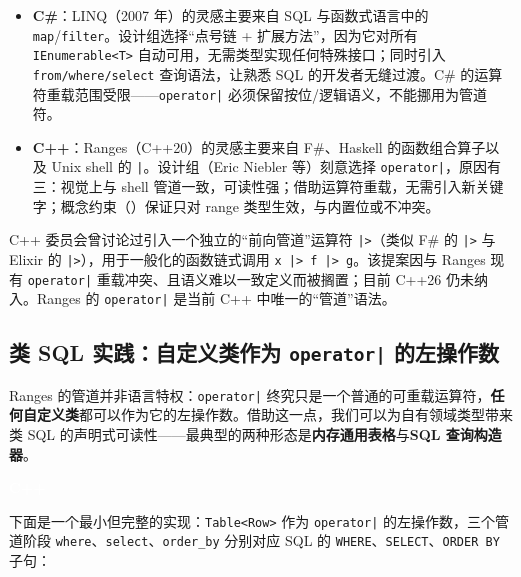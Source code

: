 \documentclass[12pt,a4paper,fontset=fandol]{ctexbook}
\newcommand{\cpp}[1]{C++#1}
\newcommand{\Tp}[1]{\texttt{#1}}
\newcommand{\csharp}{C\#}
\newcommand{\Op}[1]{\texttt{operator#1}}
\newcommand{\cpplabel}{%
  \noindent\begin{tcolorbox}[sharp corners,colback=algheadbg,colframe=algheadbg,
    left=6pt,right=6pt,top=2pt,bottom=2pt,boxrule=0pt]
  \textcolor{white}{\small\bfseries\sffamily C++}\end{tcolorbox}%
}
\begin{document}
\begin{itemize}
  \item \textbf{\csharp{}}：LINQ（2007 年）的灵感主要来自 SQL 与函数式语言中的 \Tp{map}/\allowbreak{}\Tp{filter}。设计组选择``点号链 + 扩展方法''，因为它对所有 \Tp{IEnumerable<T>} 自动可用，无需类型实现任何特殊接口；同时引入 \Tp{from/where/select} 查询语法，让熟悉 SQL 的开发者无缝过渡。\csharp{} 的运算符重载范围受限——\Op{|} 必须保留按位/逻辑语义，不能挪用为管道符。
  \item \textbf{\cpp{}}：Ranges（\cpp{20}）的灵感主要来自 F\#、Haskell 的函数组合算子以及 Unix shell 的 \texttt{|}。设计组（Eric Niebler 等）刻意选择 \Op{|}，原因有三：视觉上与 shell 管道一致，可读性强；借助运算符重载，无需引入新关键字；概念约束（）保证只对 range 类型生效，与内置位或不冲突。
\end{itemize}

\begin{note}[title=关于 C++ 的 \texttt{|>} 提案]
\cpp{} 委员会曾讨论过引入一个独立的``前向管道''运算符 \texttt{|>}（类似 F\# 的 \texttt{|>} 与 Elixir 的 \texttt{|>}），用于一般化的函数链式调用 \Tp{x |> f |> g}。该提案因与 Ranges 现有 \Op{|} 重载冲突、且语义难以一致定义而被搁置；目前 \cpp{26} 仍未纳入。Ranges 的 \Op{|} 是当前 \cpp{} 中唯一的``管道''语法。
\end{note}

\subsection{类 SQL 实践：自定义类作为 \Op{|} 的左操作数}

Ranges 的管道并非语言特权：\Op{|} 终究只是一个普通的可重载运算符，\textbf{任何自定义类}都可以作为它的左操作数。借助这一点，我们可以为自有领域类型带来类 SQL 的声明式可读性——最典型的两种形态是\textbf{内存通用表格}与\textbf{SQL 查询构造器}。

\cpplabel

下面是一个最小但完整的实现：\Tp{Table<Row>} 作为 \Op{|} 的左操作数，三个管道阶段 \Tp{where}、\Tp{select}、\Tp{order\_by} 分别对应 SQL 的 \Tp{WHERE}、\Tp{SELECT}、\Tp{ORDER BY} 子句：
\end{document}

